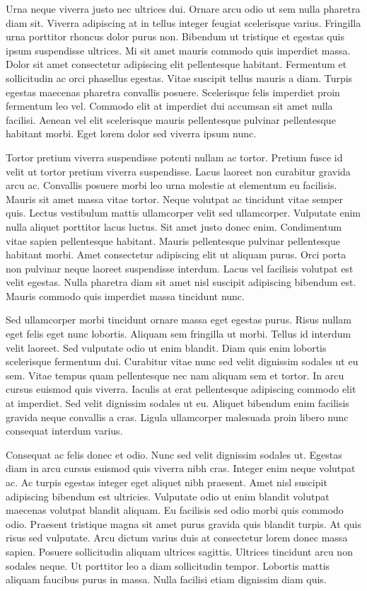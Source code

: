 \documentclass[11pt,a4paper]{article}
\begin{document}
Urna neque viverra justo nec ultrices dui. Ornare arcu odio ut sem nulla pharetra diam sit. Viverra adipiscing at in tellus integer feugiat scelerisque varius. Fringilla urna porttitor rhoncus dolor purus non. Bibendum ut tristique et egestas quis ipsum suspendisse ultrices. Mi sit amet mauris commodo quis imperdiet massa. Dolor sit amet consectetur adipiscing elit pellentesque habitant. Fermentum et sollicitudin ac orci phasellus egestas. Vitae suscipit tellus mauris a diam. Turpis egestas maecenas pharetra convallis posuere. Scelerisque felis imperdiet proin fermentum leo vel. Commodo elit at imperdiet dui accumsan sit amet nulla facilisi. Aenean vel elit scelerisque mauris pellentesque pulvinar pellentesque habitant morbi. Eget lorem dolor sed viverra ipsum nunc.

Tortor pretium viverra suspendisse potenti nullam ac tortor. Pretium fusce id velit ut tortor pretium viverra suspendisse. Lacus laoreet non curabitur gravida arcu ac. Convallis posuere morbi leo urna molestie at elementum eu facilisis. Mauris sit amet massa vitae tortor. Neque volutpat ac tincidunt vitae semper quis. Lectus vestibulum mattis ullamcorper velit sed ullamcorper. Vulputate enim nulla aliquet porttitor lacus luctus. Sit amet justo donec enim. Condimentum vitae sapien pellentesque habitant. Mauris pellentesque pulvinar pellentesque habitant morbi. Amet consectetur adipiscing elit ut aliquam purus. Orci porta non pulvinar neque laoreet suspendisse interdum. Lacus vel facilisis volutpat est velit egestas. Nulla pharetra diam sit amet nisl suscipit adipiscing bibendum est. Mauris commodo quis imperdiet massa tincidunt nunc.

Sed ullamcorper morbi tincidunt ornare massa eget egestas purus. Risus nullam eget felis eget nunc lobortis. Aliquam sem fringilla ut morbi. Tellus id interdum velit laoreet. Sed vulputate odio ut enim blandit. Diam quis enim lobortis scelerisque fermentum dui. Curabitur vitae nunc sed velit dignissim sodales ut eu sem. Vitae tempus quam pellentesque nec nam aliquam sem et tortor. In arcu cursus euismod quis viverra. Iaculis at erat pellentesque adipiscing commodo elit at imperdiet. Sed velit dignissim sodales ut eu. Aliquet bibendum enim facilisis gravida neque convallis a cras. Ligula ullamcorper malesuada proin libero nunc consequat interdum varius.

Consequat ac felis donec et odio. Nunc sed velit dignissim sodales ut. Egestas diam in arcu cursus euismod quis viverra nibh cras. Integer enim neque volutpat ac. Ac turpis egestas integer eget aliquet nibh praesent. Amet nisl suscipit adipiscing bibendum est ultricies. Vulputate odio ut enim blandit volutpat maecenas volutpat blandit aliquam. Eu facilisis sed odio morbi quis commodo odio. Praesent tristique magna sit amet purus gravida quis blandit turpis. At quis risus sed vulputate. Arcu dictum varius duis at consectetur lorem donec massa sapien. Posuere sollicitudin aliquam ultrices sagittis. Ultrices tincidunt arcu non sodales neque. Ut porttitor leo a diam sollicitudin tempor. Lobortis mattis aliquam faucibus purus in massa. Nulla facilisi etiam dignissim diam quis.
\end{document}
